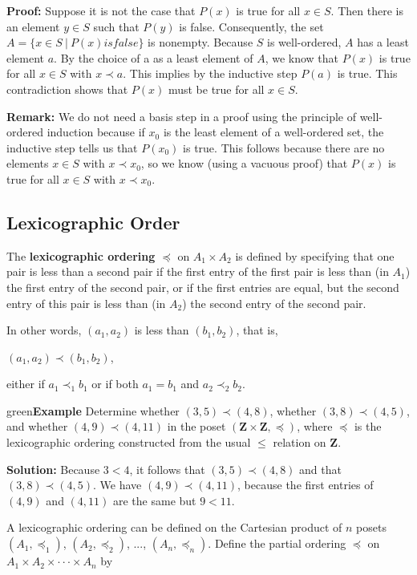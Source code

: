 \documentclass[11pt]{article}
\newenvironment{example}[1][\unskip]{\begin{mybox}{green}{\textbf{Example} {#1}}}{\end{mybox}}
\begin{document}
\textbf{Proof:} Suppose it is not the case that $P(x)$ is true for all $x \in S$. Then there is an element $y \in S$ such that $P(y)$ is false. Consequently, the set $A = \{x \in S\ |\ P(x) is false\}$ is nonempty. Because $S$ is well-ordered, $A$ has a least element $a$. By the choice of a as a least element of $A$, we know that $P(x)$ is true for all $x \in S$ with $x \prec a$. This implies by the inductive step $P(a)$ is true. This contradiction shows that $P(x)$ must be true for all $x \in S$.

\textbf{Remark:} We do not need a basis step in a proof using the principle of well-ordered induction because if $x_0$ is the least element of a well-ordered set, the inductive step tells us that $P(x_0)$ is true. This follows because there are no elements $x \in S$ with $x \prec x_0$, so we know (using a vacuous proof) that $P(x)$ is true for all $x \in S$ with $x \prec x_0$.

\subsection{Lexicographic Order}

The \textbf{lexicographic ordering $\preceq$} on $A_1 \times A_2$ is defined by specifying that one pair is less than a second pair if the first entry of the first pair is less than (in $A_1$) the first entry of the second pair, or if the first entries are equal, but the second entry of this pair is less than (in $A_2$) the second entry of the second pair. 

\noindent In other words, $(a_1, a_2)$ is less than $(b_1, b_2)$, that is,

$(a_1, a_2) \prec (b_1, b_2)$,

\noindent either if $a_1 \prec_1 b_1$ or if both $a_1 = b_1$ and $a_2 \prec_2 b_2$.

\begin{example}
Determine whether $(3, 5) \prec (4, 8)$, whether $(3, 8) \prec (4, 5)$, and whether $(4, 9) \prec (4, 11)$ in the poset $(\mathbf{Z \times Z}, \preceq)$, where $\preceq$ is the lexicographic ordering constructed from the usual $\leq$ relation on $\mathbf{Z}$.

\textbf{Solution:} Because $3 < 4$, it follows that $(3, 5) \prec (4, 8)$ and that $(3, 8) \prec (4, 5)$. We have $(4, 9) \prec (4, 11)$, because the first entries of $(4, 9)$ and $(4, 11)$ are the same but $9 < 11$.
\end{example}

A lexicographic ordering can be defined on the Cartesian product of $n$ posets $(A_1, \preceq_1)$, $(A_2, \preceq_2)$, ..., $(A_n, \preceq_n)$. Define the partial ordering $\preceq$ on $A_1 \times A_2 \times \cdot \cdot \cdot \times A_n$ by 
\end{document}
